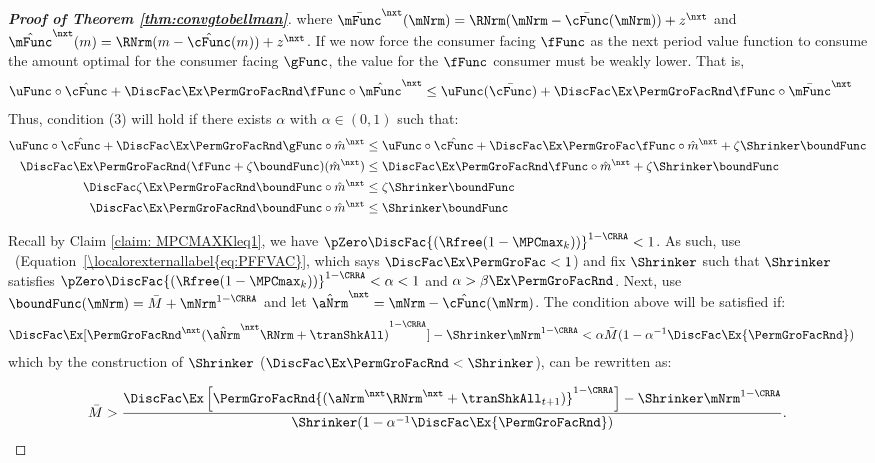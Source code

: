 \documentclass[\econtexRoot/BufferStockTheory]{subfiles}
\begin{document}
\begin{proof}[\textbf{Proof of Theorem \ref{thm:convgtobellman}}]
where $\bar{\mFunc}^{\nxt}(\mNrm) = \RNrm(\mNrm - \bar{\cFunc}(\mNrm)) + z^{\nxt}$ and $\hat{\mFunc}^{\nxt}(m) = \RNrm(m - \hat{\cFunc}(m)) + z^{\nxt}$. If we now force the consumer facing $\fFunc$ as the next period value function to consume the amount optimal for the consumer facing $\gFunc$, the value for the $\fFunc$ consumer must be weakly lower.  That is,
%
%
%
\begin{align*}
  \uFunc\circ \hat{\cFunc} +\DiscFac \Ex \PermGroFacRnd \fFunc\circ\hat{\mFunc}^{\nxt} & \leq \uFunc(\bar{\cFunc}) + \DiscFac\Ex\PermGroFacRnd \fFunc\circ\bar{\mFunc}^{\nxt}
\end{align*}
%
%
%
Thus, condition (3) will hold if there exists $\alpha$ with $\alpha\in (0,1)$ such that:
%
%
\begin{align*}
  \uFunc\circ \hat{\cFunc} +\DiscFac \Ex\PermGroFacRnd \gFunc \circ \hat{m}^{\nxt}  & \leq  \uFunc\circ \hat{\cFunc} + \DiscFac \Ex \PermGroFac \fFunc\circ\hat{m}^{\nxt}  + \zeta \Shrinker \boundFunc
  \\ \DiscFac\Ex\PermGroFacRnd (\fFunc +\zeta \boundFunc)(\hat{m}^{\nxt})  & \leq  \DiscFac \Ex\PermGroFacRnd \fFunc\circ \hat{m}^{\nxt}  + \zeta \Shrinker \boundFunc
  \\ \DiscFac\zeta \Ex\PermGroFacRnd  \boundFunc\circ\hat{m}^{\nxt}  & \leq  \zeta \Shrinker \boundFunc
  \\ \DiscFac \Ex\PermGroFacRnd \boundFunc \circ \hat{m}^{\nxt}  & \leq  \Shrinker \boundFunc
\end{align*}%

Recall by Claim \ref{claim: MPCMAXKleq1}, we have $\pZero \DiscFac {(\Rfree (1-\MPCmax_{k}))}^{1-\CRRA}   < 1$. As such, use \FVAC~(Equation~\eqref{\localorexternallabel{eq:PFFVAC}}, which says $\DiscFac\Ex\PermGroFac<1$) and fix $\Shrinker$ such that $\Shrinker$ satisfies $\pZero \DiscFac {(\Rfree (1-\MPCmax_{k}))}^{1-\CRRA} < \alpha < 1$ and $\alpha> \beta\Ex\PermGroFacRnd$. Next, use $\boundFunc(\mNrm)= \bar{M} + \mNrm^{1-\CRRA}$ and let $\hat{\aNrm}^{\nxt} = \mNrm - \hat{\cFunc}(\mNrm)$. The condition above will be satisfied if:
%
%
\begin{align*}
  \DiscFac \Ex [{\PermGroFacRnd}^{\nxt}{(\hat{\aNrm}^{\nxt}\RNrm+\tranShkAll)}^{1-\CRRA}]-\Shrinker\mNrm^{1-\CRRA}  & < \alpha\bar{M}(1-\alpha^{-1}\DiscFac\Ex {\PermGroFacRnd})
\end{align*}
%
%
which by the construction of $\Shrinker$ ($\DiscFac\Ex\PermGroFacRnd<\Shrinker$), can be rewritten as:
%
%

\begin{equation}\begin{gathered}\begin{aligned}
      \bar{M}>\frac{\DiscFac \Ex\left[\PermGroFacRnd{(\aNrm^{\nxt}\RNrm^{\nxt} +\tranShkAll_{t+1})}^{1-\CRRA}\right]- \Shrinker\mNrm^{1-\CRRA}}{\Shrinker(1-\alpha^{-1}\DiscFac\Ex {\PermGroFacRnd})}\label{eq:KeyCondition}.
    \end{aligned}\end{gathered}\end{equation}


\end{proof}
\end{document}
